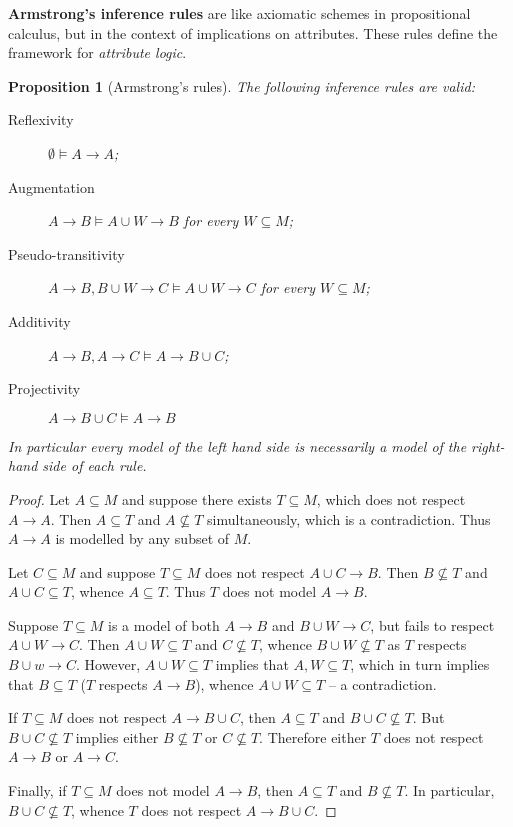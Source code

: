 \documentclass[a4paper]{article}
\newtheorem{prop}{Proposition}
\begin{document}
\textbf{Armstrong's inference rules} are like axiomatic schemes in propositional calculus, but in the context of implications on attributes. These rules define the framework for \emph{attribute logic}.

\begin{prop}[Armstrong's rules] The following inference rules are valid: \begin{description}
	\item[Reflexivity] $\emptyset\models A\to A$;
	\item[Augmentation] $A\to B\models A\cup W \to B$ for every $W\subseteq M$;
	\item[Pseudo-transitivity] $A\to B, B\cup W\to C\models A\cup W \to C$ for every $W\subseteq M$;
	\item[Additivity] $A\to B, A\to C\models A\to B\cup C$;
	\item[Projectivity] $A\to B\cup C\models A\to B$
\end{description}
In particular every model of the left hand side is necessarily a model of the right-hand side of each rule.
\end{prop}

\begin{proof}
Let $A\subseteq M$ and suppose there exists $T\subseteq M$, which does not respect $A\to A$. Then $A\subseteq T$ and $A\not\subseteq T$ simultaneously, which is a contradiction. Thus $A\to A$ is modelled by any subset of $M$.

Let $C\subseteq M$ and suppose $T\subseteq M$ does not respect $A\cup C \to B$. Then $B\not\subseteq T$ and $A\cup C \subseteq T$, whence $A\subseteq T$. Thus $T$ does not model $A\to B$.

Suppose $T\subseteq M$ is a model of both $A\to B$ and $B\cup W \to C$, but fails to respect $A\cup W\to C$. Then $A\cup W \subseteq T$ and $C\not\subseteq T$, whence $B\cup W \not\subseteq T$ as $T$ respects $B\cup w\to C$. However, $A\cup W\subseteq T$ implies that $A,W\subseteq T$, which in turn implies that $B\subseteq T$ ($T$ respects $A\to B$), whence $A\cup W\subseteq T$ -- a contradiction.

If $T\subseteq M$ does not respect $A\to B\cup C$, then $A\subseteq T$ and $B\cup C\not\subseteq T$. But $B\cup C\not\subseteq T$ implies either $B\not\subseteq T$ or $C\not\subseteq T$. Therefore either $T$ does not respect $A\to B$ or $A\to C$.

Finally, if $T\subseteq M$ does not model $A\to B$, then $A\subseteq T$ and $B\not\subseteq T$. In particular, $B\cup C\not\subseteq T$, whence $T$ does not respect $A\to B\cup C$.
\end{proof}
\end{document}
